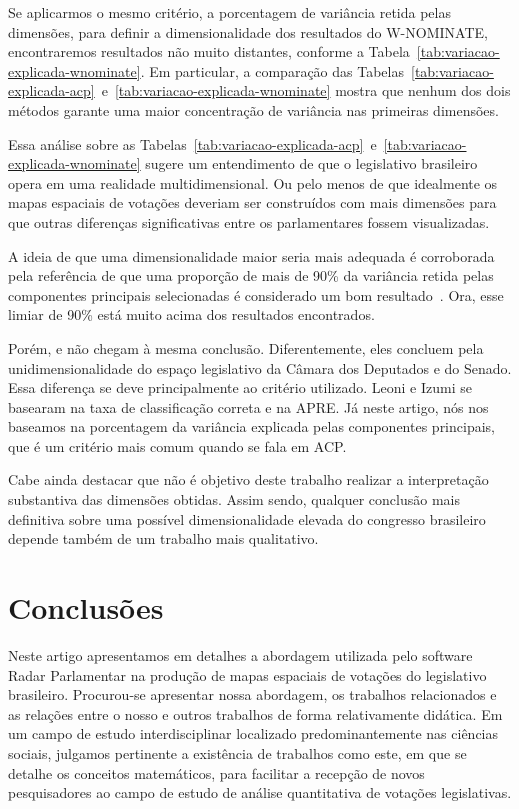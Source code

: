 \documentclass[
	article,			%
	12pt,				%
    twoside,			%
	a4paper,			%
	english,			%
	french,				%
	spanish,			%
	brazil,				%
	]{abntex2}
\newcommand\wnominate{W-NOMINATE\xspace}
\begin{document}
Se aplicarmos o mesmo critério, a porcentagem de variância retida pelas dimensões, para definir a dimensionalidade dos resultados do \wnominate, encontraremos resultados não muito distantes, conforme a Tabela~\ref{tab:variacao-explicada-wnominate}. Em particular, a comparação das Tabelas~\ref{tab:variacao-explicada-acp}~e~\ref{tab:variacao-explicada-wnominate} mostra que nenhum dos dois métodos garante uma maior concentração de variância nas primeiras dimensões.

Essa análise sobre as Tabelas~\ref{tab:variacao-explicada-acp}~e~\ref{tab:variacao-explicada-wnominate} sugere um entendimento de que o legislativo brasileiro opera em uma realidade multidimensional. Ou pelo menos de que idealmente os mapas espaciais de votações deveriam ser construídos com mais dimensões para que outras diferenças significativas entre os parlamentares fossem visualizadas. 

A ideia de que uma dimensionalidade maior seria mais adequada é corroborada pela referência de que uma proporção de mais de 90\% da variância retida pelas componentes principais selecionadas é considerado um bom resultado~\cite{DataMining2003}. Ora, esse limiar de 90\% está muito acima dos resultados encontrados.

Porém,  e  não chegam à mesma conclusão. Diferentemente, eles concluem pela unidimensionalidade do espaço legislativo da Câmara dos Deputados e do Senado. Essa diferença se deve principalmente ao critério utilizado. Leoni e Izumi se basearam na taxa de classificação correta e na APRE. Já neste artigo, nós nos baseamos na porcentagem da variância explicada pelas componentes principais, que é um critério mais comum quando se fala em ACP.

Cabe ainda destacar que não é objetivo deste trabalho realizar a interpretação substantiva das dimensões obtidas. Assim sendo, qualquer conclusão mais definitiva sobre uma possível dimensionalidade elevada do congresso brasileiro depende também de um trabalho mais qualitativo.

\section{Conclusões}
\label{sec:conclusoes}

Neste artigo apresentamos em detalhes a abordagem utilizada pelo software Radar Parlamentar na produção de mapas espaciais de votações do legislativo brasileiro. Procurou-se apresentar nossa abordagem, os trabalhos relacionados e as relações entre o nosso e outros trabalhos de forma relativamente didática. Em um campo de estudo interdisciplinar localizado predominantemente nas ciências sociais, julgamos pertinente a existência de trabalhos como este, em que se detalhe os conceitos matemáticos, para facilitar a recepção de novos pesquisadores ao campo de estudo de análise quantitativa de votações legislativas.
\end{document}
